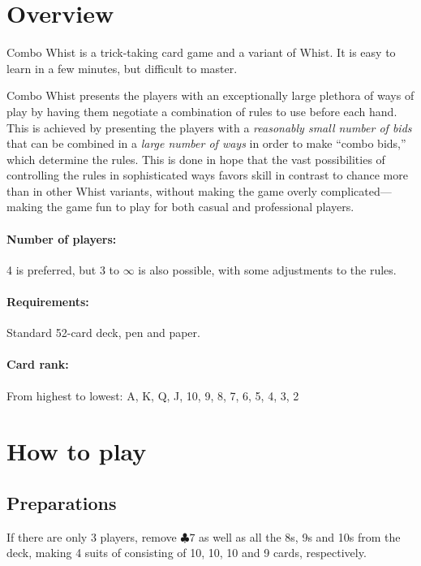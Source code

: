 \documentclass[a4paper]{article} %
\author{By Joakim Nilsson}
\date{Development version (based on version \varVersion-\varLanguage)---\today}
\date{Version \varVersion-\varLanguage---\today}
\begin{document}

	\introPages
	\pagebreak


	\section{Overview}
	Combo Whist is a trick-taking card game and a variant of Whist. It is easy to learn in a few minutes, but difficult to master.

	Combo Whist presents the players with an exceptionally large plethora of ways of play by having them negotiate a combination of rules to use before each hand. This is achieved by presenting the players with a \emph{reasonably small number of bids} that can be combined in a \emph{large number of ways} in order to make ``combo bids,'' which determine the rules. This is done in hope that the vast possibilities of controlling the rules in sophisticated ways favors skill in contrast to chance more than in other Whist variants, without making the game overly complicated---making the game fun to play for both casual and professional players.

	\paragraph{Number of players:}
	4 is preferred, but 3 to $\infty$ is also possible, with some adjustments to the rules.

	\paragraph{Requirements:}
	Standard 52-card deck, pen and paper.

	\paragraph{Card rank:}
	From highest to lowest: A, K, Q, J, 10, 9, 8, 7, 6, 5, 4, 3, 2

	\section{How to play}
	\subsection{Preparations}
	If there are only 3 players, remove $\clubsuit 7$ as well as all the 8s, 9s and 10s from the deck, making 4 suits of consisting of 10, 10, 10 and 9 cards, respectively.
\end{document}
